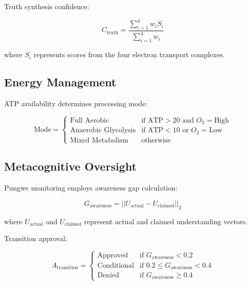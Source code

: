 \documentclass[12pt,a4paper]{article}
\begin{document}
Truth synthesis confidence:

\begin{equation}
C_{\text{truth}} = \frac{\sum_{i=1}^{4} w_i S_i}{\sum_{i=1}^{4} w_i}
\end{equation}

where $S_i$ represents scores from the four electron transport complexes.

\subsection{Energy Management}

ATP availability determines processing mode:

\begin{equation}
\text{Mode} = \begin{cases}
\text{Full Aerobic} & \text{if } \text{ATP} > 20 \text{ and } O_2 = \text{High} \\
\text{Anaerobic Glycolysis} & \text{if } \text{ATP} < 10 \text{ or } O_2 = \text{Low} \\
\text{Mixed Metabolism} & \text{otherwise}
\end{cases}
\end{equation}

\subsection{Metacognitive Oversight}

Pungwe monitoring employs awareness gap calculation:

\begin{equation}
G_{\text{awareness}} = ||U_{\text{actual}} - U_{\text{claimed}}||_2
\end{equation}

where $U_{\text{actual}}$ and $U_{\text{claimed}}$ represent actual and claimed understanding vectors.

Transition approval:

\begin{equation}
A_{\text{transition}} = \begin{cases}
\text{Approved} & \text{if } G_{\text{awareness}} < 0.2 \\
\text{Conditional} & \text{if } 0.2 \leq G_{\text{awareness}} < 0.4 \\
\text{Denied} & \text{if } G_{\text{awareness}} \geq 0.4
\end{cases}
\end{equation}
\end{document}
